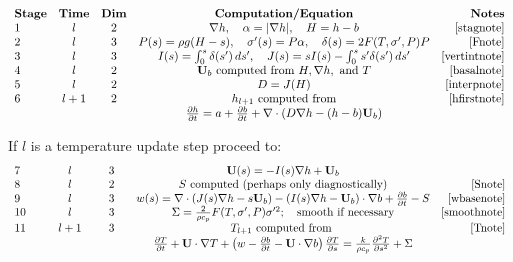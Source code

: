 \documentclass[12pt,final]{amsart}%
\theoremstyle{plain}
\theoremstyle{definition}
\theoremstyle{remark}
\newcommand{\ddt}[1]{\ensuremath{\frac{\partial #1}{\partial t}}}
\newcommand{\dds}[1]{\ensuremath{\frac{\partial #1}{\partial s}}}
\newcommand{\dddsds}[1]{\ensuremath{\frac{\partial^2 #1}{\partial s^2}}}
\newcommand{\diverg}{\nabla\cdot}
\newcommand{\grad}{\nabla}
\newcommand{\bU}{{\mathbf{U}}}
\begin{document}
\renewcommand{\arraystretch}{2}
$$\begin{array}{lcccr}
\textbf{Stage} & \textbf{Time} & \textbf{Dim} & \textbf{Computation/Equation} & \textbf{Notes} \\
1 & l & 2 & \grad h,\quad \alpha=|\grad h|, \quad H=h-b & \eqref{stagnote} \\
2 & l & 3 & P(s)=\rho g (H-s), \quad \sigma'(s)=P\alpha, \quad \delta(s)=2 F(T,\sigma',P) P & \eqref{Fnote} \\
3 & l & 3 & I(s)=\int_0^s \delta(s')\,ds', \quad J(s)=sI(s)-\int_0^s s'\delta(s')\,ds' & \eqref{vertintnote}\\
4 & l & 2 & \bU_b \text{ computed from } H, \grad h, \text{ and } T& \eqref{basalnote} \\
5 & l & 2 & D=J(H) & \eqref{interpnote} \\
6 & l+1 & 2 & h_{l+1} \text{ computed from} & \eqref{hfirstnote} \\
 &  &  & \ddt{h}= a + \ddt{b} + \diverg \left(D \grad h - (h-b)\bU_b\right) & \\
\end{array}$$

\noindent If $l$ is a temperature update step proceed to:
$$\begin{array}{lcccr}
7\phantom{tage} & \phantom{bob}l\phantom{bob} & \phantom{bo}3\phantom{bo} & \bU(s)=- I(s) \grad h+ \bU_b & \\
8 & l & 2 & S \text{ computed (perhaps only diagnostically)} & \eqref{Snote} \\
9 & l & 3 & w(s)=\diverg \left(J(s)\grad h-s\bU_b\right)-\left(I(s)\grad h-\bU_b\right)\cdot\grad b + \ddt{b}-S & \eqref{wbasenote} \\
10 & l & 3 & \Sigma = \frac{2}{\rho c_p} F(T,\sigma',P) \sigma'^2; \quad \text{smooth if necessary} & \eqref{smoothnote}\\
11 & l+1 & 3 & T_{l+1} \text{ computed from } & \eqref{Tnote} \\
 &  &  & \ddt{T}+\bU\cdot\grad T + \left(w-\ddt{b}-\bU\cdot\grad b\right)\dds{T} = \frac{k}{\rho c_p} \dddsds{T} + \Sigma & \\
\end{array}$$
\end{document}
